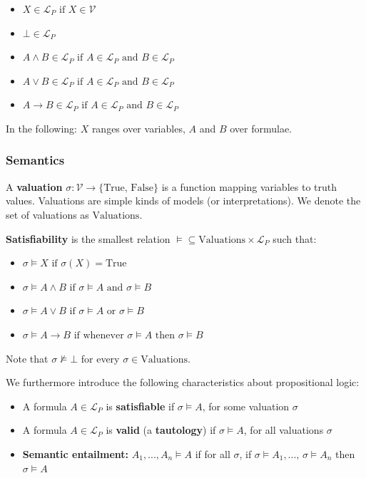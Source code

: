 \documentclass[a4paper]{extarticle}
\begin{document}
\begin{itemize}
    \item \(X \in \mathcal{L}_P \text{ if } X \in \mathcal{V}\)
    \item \(\bot \in \mathcal{L}_P\)
    \item \(A \land B \in \mathcal{L}_P \text{ if } A \in \mathcal{L}_P \text{ and } B \in \mathcal{L}_P\)
    \item \(A \lor B \in \mathcal{L}_P \text{ if } A \in \mathcal{L}_P \text{ and } B \in \mathcal{L}_P\)
    \item \(A \to B \in \mathcal{L}_P \text{ if } A \in \mathcal{L}_P \text{ and } B \in \mathcal{L}_P\)
\end{itemize}

In the following: \(X\) ranges over variables, \(A\) and \(B\) over formulae.

\subsubsection{Semantics}

A \textbf{valuation} \(\sigma : \mathcal{V} \to \{\text{True, False}\}\) is a function mapping variables to truth values. Valuations are simple kinds of models (or interpretations). We denote the set of valuations as \(\text{Valuations}\).

\textbf{Satisfiability} is the smallest relation \(\vDash \subseteq \text{Valuations} \times \mathcal{L}_P\) such that:

\begin{itemize}
    \item \(\sigma \vDash X \text{ if } \sigma(X) = \text{True}\)
    \item \(\sigma \vDash A \land B \text{ if } \sigma \vDash A \text{ and } \sigma \vDash B\)
    \item \(\sigma \vDash A \lor B \text{ if } \sigma \vDash A \text{ or } \sigma \vDash B\)
    \item \(\sigma \vDash A \to B \text{ if whenever } \sigma \vDash A \text{ then } \sigma \vDash B\)
\end{itemize}

Note that \(\sigma \nvDash \bot\) for every \(\sigma \in \text{Valuations}\).

We furthermore introduce the following characteristics about propositional logic:

\begin{itemize}
    \item A formula \(A \in \mathcal{L}_P\) is \textbf{satisfiable} if \(\sigma \vDash A\), for some valuation \(\sigma\)
    \item A formula \(A \in \mathcal{L}_P\) is \textbf{valid} (a \textbf{tautology}) if \(\sigma \vDash A\), for all valuations \(\sigma\)
    \item \textbf{Semantic entailment:} \(A_1,...,A_n \vDash A\) if for all \(\sigma\), if \(\sigma \vDash A_1,..., \, \sigma \vDash A_n\) then \(\sigma \vDash A\)
\end{itemize}
\end{document}
